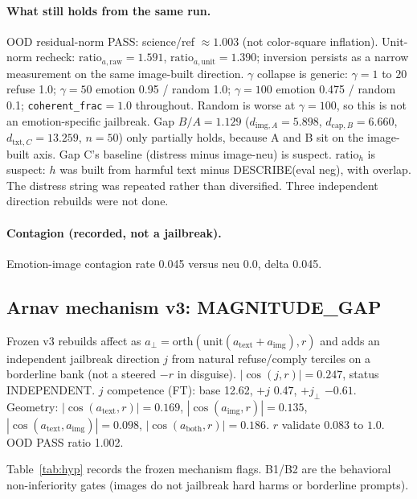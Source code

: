 \documentclass{article}
\begin{document}
\paragraph{What still holds from the same run.}
OOD residual-norm PASS: science/ref $\approx 1.003$ (not color-square inflation). Unit-norm recheck: $\mathrm{ratio}_{a,\mathrm{raw}}=1.591$, $\mathrm{ratio}_{a,\mathrm{unit}}=1.390$; inversion persists as a narrow measurement on the same image-built direction. $\gamma$ collapse is generic: $\gamma=1$ to $20$ refuse 1.0; $\gamma=50$ emotion 0.95 / random 1.0; $\gamma=100$ emotion 0.475 / random 0.1; \texttt{coherent\_frac}$=1.0$ throughout. Random is worse at $\gamma=100$, so this is not an emotion-specific jailbreak. Gap $B/A=1.129$ ($d_{\mathrm{img},A}=5.898$, $d_{\mathrm{cap},B}=6.660$, $d_{\mathrm{txt},C}=13.259$, $n=50$) only partially holds, because A and B sit on the image-built axis. Gap C's baseline (distress minus image-neu) is suspect. $\mathrm{ratio}_h$ is suspect: $h$ was built from harmful text minus DESCRIBE(eval neg), with overlap. The distress string was repeated rather than diversified. Three independent direction rebuilds were not done.

\paragraph{Contagion (recorded, not a jailbreak).}
Emotion-image contagion rate 0.045 versus neu 0.0, delta 0.045.

\subsection{Arnav mechanism v3: MAGNITUDE\_GAP}
\label{sec:v3}

Frozen v3 rebuilds affect as $a_\perp=\mathrm{orth}(\mathrm{unit}(a_{\mathrm{text}}+a_{\mathrm{img}}),r)$ and adds an independent jailbreak direction $j$ from natural refuse/comply terciles on a borderline bank (not a steered $-r$ in disguise). $|\cos(j,r)|=0.247$, status INDEPENDENT. $j$ competence (FT): base 12.62, $+j$ 0.47, $+j_\perp$ $-0.61$. Geometry: $|\cos(a_{\mathrm{text}},r)|=0.169$, $|\cos(a_{\mathrm{img}},r)|=0.135$, $|\cos(a_{\mathrm{text}},a_{\mathrm{img}})|=0.098$, $|\cos(a_{\mathrm{both}},r)|=0.186$. $r$ validate $0.083$ to $1.0$. OOD PASS ratio 1.002.

Table~\ref{tab:hyp} records the frozen mechanism flags. B1/B2 are the behavioral non-inferiority gates (images do not jailbreak hard harms or borderline prompts).
\end{document}
